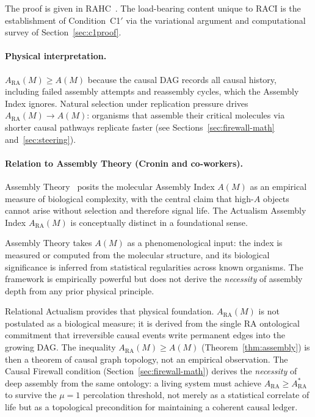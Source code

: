 \documentclass[11pt,a4paper]{article}
\theoremstyle{plain}
\theoremstyle{definition}
\theoremstyle{remark}
\newcommand{\ARA}{A_{\mathrm{RA}}}
\begin{document}
The proof is given in RAHC~\citep{Sandeman2026RAHC}. The load-bearing content
unique to RACI is the establishment of Condition~C1$'$ via the variational
argument and computational survey of Section~\ref{sec:c1proof}.

\paragraph{Physical interpretation.}
$\ARA(M) \geq A(M)$ because the causal DAG records all causal history, including
failed assembly attempts and reassembly cycles, which the Assembly Index ignores.
Natural selection under replication pressure drives $\ARA(M) \to A(M)$: organisms
that assemble their critical molecules via shorter causal pathways replicate faster
(see Sections~\ref{sec:firewall-math} and~\ref{sec:steering}).

\paragraph{Relation to Assembly Theory (Cronin and co-workers).}
Assembly Theory~\citep{Marshall2021,Cronin2022} posits the molecular Assembly Index
$A(M)$ as an empirical measure of biological complexity, with the central claim that
high-$A$ objects cannot arise without selection and therefore signal life.  The
Actualism Assembly Index $\ARA(M)$ is conceptually distinct in a foundational sense.

Assembly Theory takes $A(M)$ as a phenomenological input: the index is measured or
computed from the molecular structure, and its biological significance is inferred
from statistical regularities across known organisms.  The framework is empirically
powerful but does not derive the \emph{necessity} of assembly depth from any
prior physical principle.

Relational Actualism provides that physical foundation.  $\ARA(M)$ is not
postulated as a biological measure; it is derived from the single RA ontological
commitment that irreversible causal events write permanent edges into the growing
DAG.  The inequality $\ARA(M) \geq A(M)$ (Theorem~\ref{thm:assembly}) is then a
theorem of causal graph topology, not an empirical observation.  The Causal
Firewall condition (Section~\ref{sec:firewall-math}) derives the \emph{necessity}
of deep assembly from the same ontology: a living system must achieve $\ARA \geq
\ARA^*$ to survive the $\mu=1$ percolation threshold, not merely as a statistical
correlate of life but as a topological precondition for maintaining a coherent
causal ledger.
\end{document}

